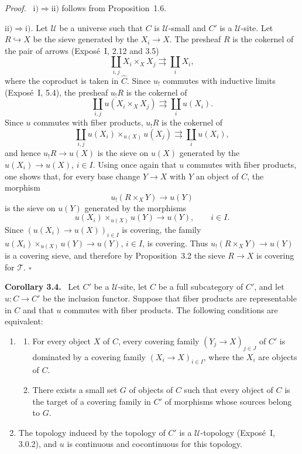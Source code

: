 \documentclass[11pt]{article}
\newcommand{\U}{\mathcal{U}}
\newcommand{\T}{\mathcal{T}}
\newcommand{\qedtext}{\hfill\(\square\)}
\newenvironment{statement}[1]{\par\medskip\noindent\textbf{#1.}\ }{\par\medskip}
\newenvironment{prooftext}{\par\noindent\emph{Proof.}\ }{\par\medskip}
\begin{document}
\begin{prooftext}
\emph{\(\mathrm{i)}\Rightarrow\mathrm{ii)}\)} follows from Proposition~1.6.

\emph{\(\mathrm{ii)}\Rightarrow\mathrm{i)}\).} Let \(\U\) be a universe such that \(C\) is \(\U\)-small and \(C'\) is a \(\U\)-site. Let \(R\hookrightarrow X\) be the sieve generated by the \(X_i\to X\). The presheaf \(R\) is the cokernel of the pair of arrows (Expos\'e~I, 2.12 and 3.5)
\[
\coprod_{i,j}X_i\times_XX_j\rightrightarrows\coprod_iX_i,
\]
where the coproduct is taken in \(\widehat C\). Since \(u_!\) commutes with inductive limits (Expos\'e~I, 5.4), the presheaf \(u_!R\) is the cokernel of
\[
\coprod_{i,j}u(X_i\times_XX_j)\rightrightarrows\coprod_i u(X_i).
\]
Since \(u\) commutes with fiber products, \(u_!R\) is the cokernel of
\[
\coprod_{i,j}u(X_i)\times_{u(X)}u(X_j)\rightrightarrows\coprod_i u(X_i),
\]
and hence \(u_!R\to u(X)\) is the sieve on \(u(X)\) generated by the \(u(X_i)\to u(X)\), \(i\in I\). Using once again that \(u\) commutes with fiber products, one shows that, for every base change \(Y\to X\) with \(Y\) an object of \(C\), the morphism
\[
u_!(R\times_XY)\to u(Y)
\]
is the sieve on \(u(Y)\) generated by the morphisms
\[
u(X_i)\times_{u(X)}u(Y)\to u(Y),\qquad i\in I.
\]
Since \((u(X_i)\to u(X))_{i\in I}\) is covering, the family \(u(X_i)\times_{u(X)}u(Y)\to u(Y)\), \(i\in I\), is covering. Thus \(u_!(R\times_XY)\to u(Y)\) is a covering sieve, and therefore by Proposition~3.2 the sieve \(R\to X\) is covering for \(\T\). \qedtext
\end{prooftext}

\begin{statement}{Corollary 3.4}
Let \(C'\) be a \(\U\)-site, let \(C\) be a full subcategory of \(C'\), and let \(u:C\to C'\) be the inclusion functor. Suppose that fiber products are representable in \(C\) and that \(u\) commutes with fiber products. The following conditions are equivalent:
\begin{enumerate}[label=\roman*)]
\item
\begin{enumerate}[label=\alph*)]
\item For every object \(X\) of \(C\), every covering family \((Y_j\to X)_{j\in J}\) of \(C'\) is dominated by a covering family \((X_i\to X)_{i\in I}\), where the \(X_i\) are objects of \(C\).
\item There exists a small set \(G\) of objects of \(C\) such that every object of \(C\) is the target of a covering family in \(C'\) of morphisms whose sources belong to \(G\).
\end{enumerate}
\item The topology induced by the topology of \(C'\) is a \(\U\)-topology (Expos\'e~I, 3.0.2), and \(u\) is continuous and cocontinuous for this topology.
\end{enumerate}
\end{statement}
\end{document}
